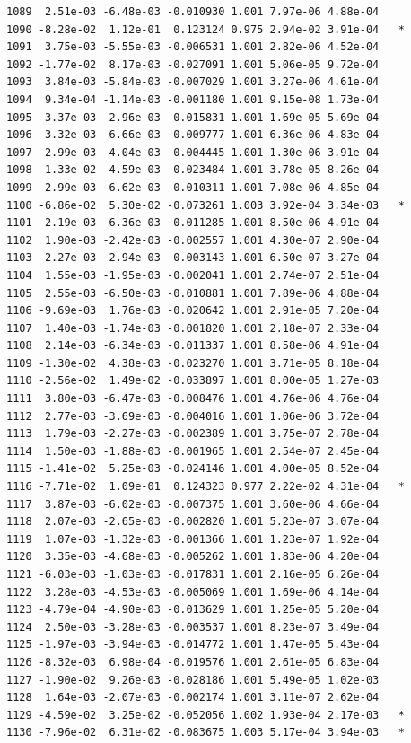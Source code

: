 \documentclass[
  letterpaper,
  DIV=11,
  numbers=noendperiod]{scrartcl}
\begin{document}
\begin{verbatim}
1089  2.51e-03 -6.48e-03 -0.010930 1.001 7.97e-06 4.88e-04    
1090 -8.28e-02  1.12e-01  0.123124 0.975 2.94e-02 3.91e-04   *
1091  3.75e-03 -5.55e-03 -0.006531 1.001 2.82e-06 4.52e-04    
1092 -1.77e-02  8.17e-03 -0.027091 1.001 5.06e-05 9.72e-04    
1093  3.84e-03 -5.84e-03 -0.007029 1.001 3.27e-06 4.61e-04    
1094  9.34e-04 -1.14e-03 -0.001180 1.001 9.15e-08 1.73e-04    
1095 -3.37e-03 -2.96e-03 -0.015831 1.001 1.69e-05 5.69e-04    
1096  3.32e-03 -6.66e-03 -0.009777 1.001 6.36e-06 4.83e-04    
1097  2.99e-03 -4.04e-03 -0.004445 1.001 1.30e-06 3.91e-04    
1098 -1.33e-02  4.59e-03 -0.023484 1.001 3.78e-05 8.26e-04    
1099  2.99e-03 -6.62e-03 -0.010311 1.001 7.08e-06 4.85e-04    
1100 -6.86e-02  5.30e-02 -0.073261 1.003 3.92e-04 3.34e-03   *
1101  2.19e-03 -6.36e-03 -0.011285 1.001 8.50e-06 4.91e-04    
1102  1.90e-03 -2.42e-03 -0.002557 1.001 4.30e-07 2.90e-04    
1103  2.27e-03 -2.94e-03 -0.003143 1.001 6.50e-07 3.27e-04    
1104  1.55e-03 -1.95e-03 -0.002041 1.001 2.74e-07 2.51e-04    
1105  2.55e-03 -6.50e-03 -0.010881 1.001 7.89e-06 4.88e-04    
1106 -9.69e-03  1.76e-03 -0.020642 1.001 2.91e-05 7.20e-04    
1107  1.40e-03 -1.74e-03 -0.001820 1.001 2.18e-07 2.33e-04    
1108  2.14e-03 -6.34e-03 -0.011337 1.001 8.58e-06 4.91e-04    
1109 -1.30e-02  4.38e-03 -0.023270 1.001 3.71e-05 8.18e-04    
1110 -2.56e-02  1.49e-02 -0.033897 1.001 8.00e-05 1.27e-03    
1111  3.80e-03 -6.47e-03 -0.008476 1.001 4.76e-06 4.76e-04    
1112  2.77e-03 -3.69e-03 -0.004016 1.001 1.06e-06 3.72e-04    
1113  1.79e-03 -2.27e-03 -0.002389 1.001 3.75e-07 2.78e-04    
1114  1.50e-03 -1.88e-03 -0.001965 1.001 2.54e-07 2.45e-04    
1115 -1.41e-02  5.25e-03 -0.024146 1.001 4.00e-05 8.52e-04    
1116 -7.71e-02  1.09e-01  0.124323 0.977 2.22e-02 4.31e-04   *
1117  3.87e-03 -6.02e-03 -0.007375 1.001 3.60e-06 4.66e-04    
1118  2.07e-03 -2.65e-03 -0.002820 1.001 5.23e-07 3.07e-04    
1119  1.07e-03 -1.32e-03 -0.001366 1.001 1.23e-07 1.92e-04    
1120  3.35e-03 -4.68e-03 -0.005262 1.001 1.83e-06 4.20e-04    
1121 -6.03e-03 -1.03e-03 -0.017831 1.001 2.16e-05 6.26e-04    
1122  3.28e-03 -4.53e-03 -0.005069 1.001 1.69e-06 4.14e-04    
1123 -4.79e-04 -4.90e-03 -0.013629 1.001 1.25e-05 5.20e-04    
1124  2.50e-03 -3.28e-03 -0.003537 1.001 8.23e-07 3.49e-04    
1125 -1.97e-03 -3.94e-03 -0.014772 1.001 1.47e-05 5.43e-04    
1126 -8.32e-03  6.98e-04 -0.019576 1.001 2.61e-05 6.83e-04    
1127 -1.90e-02  9.26e-03 -0.028186 1.001 5.49e-05 1.02e-03    
1128  1.64e-03 -2.07e-03 -0.002174 1.001 3.11e-07 2.62e-04    
1129 -4.59e-02  3.25e-02 -0.052056 1.002 1.93e-04 2.17e-03   *
1130 -7.96e-02  6.31e-02 -0.083675 1.003 5.17e-04 3.94e-03   *

\end{verbatim}
\end{document}
